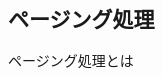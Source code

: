 \documentclass[../../../main]{subfiles}
\begin{document}
    \subsection{ページング処理}\label{subsec:phraseology-paging_pagination}

    ページング処理とは
\end{document}
